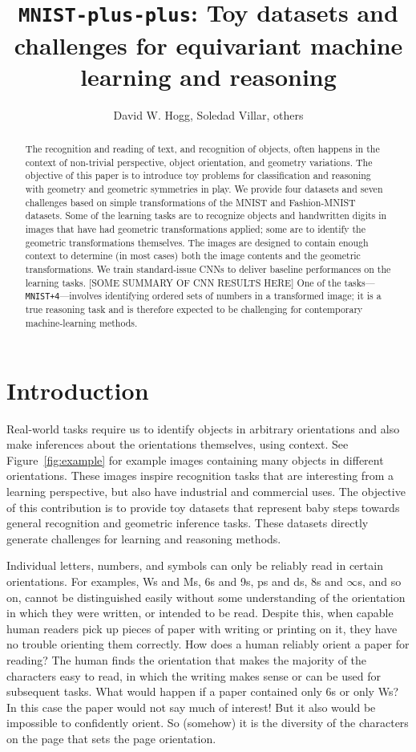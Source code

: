 \documentclass{article}
\title{\bfseries \texttt{MNIST-plus-plus}: Toy datasets and challenges for equivariant machine learning and reasoning}
\author{David W. Hogg,  Soledad Villar, others}
\date{}
\begin{document}
\maketitle\thispagestyle{empty}

\begin{abstract}\noindent
    The recognition and reading of text, and recognition of objects, often happens in the context of non-trivial perspective, object orientation, and geometry variations.
    The objective of this paper is to introduce toy problems for classification and reasoning with geometry and geometric symmetries in play.
    We provide four datasets and seven challenges based on simple transformations of the MNIST and Fashion-MNIST datasets.
    Some of the learning tasks are to recognize objects and handwritten digits in images that have had geometric transformations applied; some are to identify the geometric transformations themselves.
    The images are designed to contain enough context to determine (in most cases) both the image contents and the geometric transformations.
    We train standard-issue CNNs to deliver baseline performances on the learning tasks.
    [SOME SUMMARY OF CNN RESULTS HERE]
    One of the tasks---\texttt{MNIST+4}---involves identifying ordered sets of numbers in a transformed image; it is a true reasoning task and is therefore expected to be challenging for contemporary machine-learning methods.
\end{abstract}

\section{Introduction}

Real-world tasks require us to identify objects in arbitrary orientations and also make inferences about the orientations themselves, using context. 
See Figure~\ref{fig:example} for example images containing many objects in different orientations.
These images inspire recognition tasks that are interesting from a learning perspective, but also have industrial and commercial uses.
The objective of this contribution is to provide toy datasets that represent baby steps towards general recognition and geometric inference tasks.
These datasets directly generate challenges for learning and reasoning methods.

Individual letters, numbers, and symbols can only be reliably read in certain orientations.
For examples, Ws and Ms, 6s and 9s, ps and ds, 8s and $\infty$s, and so on, cannot be distinguished easily without some understanding of the orientation in which they were written, or intended to be read.
Despite this, when capable human readers pick up pieces of paper with writing or printing on it, they have no trouble orienting them correctly.
How does a human reliably orient a paper for reading?
The human finds the orientation that makes the majority of the characters easy to read, in which the writing makes sense or can be used for subsequent tasks.
What would happen if a paper contained only 6s or only Ws?
In this case the paper would not say much of interest!
But it also would be impossible to confidently orient.
So (somehow) it is the diversity of the characters on the page that sets the page orientation.
\end{document}
